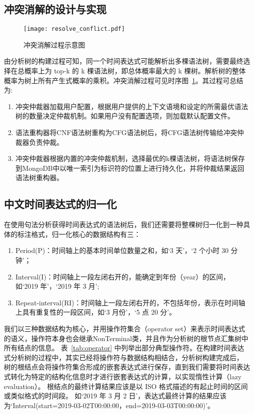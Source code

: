 \subsection{冲突消解的设计与实现}

\begin{figure}[h]
    \centering
    \texttt{[image: resolve\_conflict.pdf]}
    \caption{冲突消解过程示意图}
    \label{fig:conflict_resolution}
\end{figure}

由分析树的构建过程可知，同一个时间表达式可能解析出多棵语法树，需要最终选择在总概率上为 top-k 的
k 棵语法树，即总体概率最大的 k 棵树。解析树的整体概率为树上所有产生式概率的乘积。冲突消解过程可见时序图~\ref{fig:conflict_resolution}。其过程可总结为: 
\begin{enumerate}
    \item[(1)] 冲突仲裁器加载用户配置，根据用户提供的上下文语境和设定的所需最优语法树的数量决定仲裁机制。如果用户没有配置选项，则加载默认配置文件。
    \item[(2)] 语法重构器将CNF语法树重构为CFG语法树后，将CFG语法树传输给冲突仲裁器负责仲裁。
    \item[(3)] 冲突仲裁器根据内置的冲突仲裁机制，选择最优的k棵语法树，将语法树保存到MongoDB中以唯一索引为标识符的位置上进行持久化，并将仲裁结果返回语法树重构器。
\end{enumerate}

\subsection{中文时间表达式的归一化}

在使用句法分析获得时间表达式的语法树后，我们还需要将整棵树归一化到一种具体的标注格式，归一化核心的数据结构有三：
\begin{enumerate}
    \item[(1)] Period(P)：时间轴上的基本时间单位数量之和，如‘3 天’，‘2 个小时 30 分钟’；
    \item[(2)] Interval(I)：时间轴上一段左闭右开的，能确定到年份（year）的区间，如‘2019 年’，‘2019 年 3 月’;
    \item[(3)] Repeat-interval(RI)：时间轴上一段左闭右开的，不包括年份，表示在时间轴上具有重复性的一段区间，如‘3 月份’，‘5 点 20 分’。
\end{enumerate}

我们以三种数据结构为核心，并用操作符集合（operator set）来表示时间表达式的语义，操作符本身也会继承NonTerminal类，并且作为分析树的根节点汇集树中所有结点的信息。
表~\ref{tab:operator} 中列举出部分典型操作符。在构建时间表达式分析树的过程中，其实已经将操作符与数据结构相结合，分析树构建完成后，
树的根结点会将操作符集合形成的嵌套表达式进行保存，直到我们需要将时间表达式转化为特定的结构化信息时才进行嵌套表达式的计算，以实现惰性计算（lazy evaluation）。
根结点的最终计算结果应该是以 ISO 格式描述的有起止时间的区间或类似格式的时间段。
如‘2019 年 3 月 2 日’，表达式最终计算的结果应该为‘Interval(start=2019-03-02T00:00:00，end=2019-03-03T00:00:00)’。

